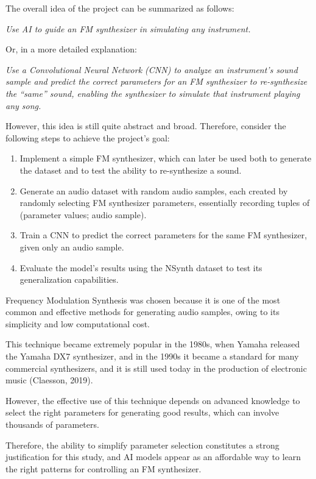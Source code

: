 \documentclass[sigconf,natbib=false]{acmart}
\begin{document}
The overall idea of the project can be summarized as follows:

\textit{Use AI to guide an FM synthesizer in simulating any instrument.}

Or, in a more detailed explanation:

\textit{Use a Convolutional Neural Network (CNN) to analyze an instrument's sound sample and predict the correct parameters for an FM synthesizer to re-synthesize the ``same'' sound, enabling the synthesizer to simulate that instrument playing any song.}

However, this idea is still quite abstract and broad. Therefore, consider the following steps to achieve the project's goal:

\begin{enumerate}
\item Implement a simple FM synthesizer, which can later be used both to generate the dataset and to test the ability to re-synthesize a sound.
\item Generate an audio dataset with random audio samples, each created by randomly selecting FM synthesizer parameters, essentially recording tuples of (parameter values; audio sample).
\item Train a CNN to predict the correct parameters for the same FM synthesizer, given only an audio sample.
\item Evaluate the model's results using the NSynth dataset to test its generalization capabilities.
\end{enumerate}

Frequency Modulation Synthesis was chosen because it is one of the most common and effective methods for generating audio samples, owing to its simplicity and low computational cost.

This technique became extremely popular in the 1980s, when Yamaha released the Yamaha DX7 synthesizer, and in the 1990s it became a standard for many commercial synthesizers, and it is still used today in the production of electronic music (Claesson, 2019).

However, the effective use of this technique depends on advanced knowledge to select the right parameters for generating good results, which can involve thousands of parameters.

Therefore, the ability to simplify parameter selection constitutes a strong justification for this study, and AI models appear as an affordable way to learn the right patterns for controlling an FM synthesizer.
\end{document}
